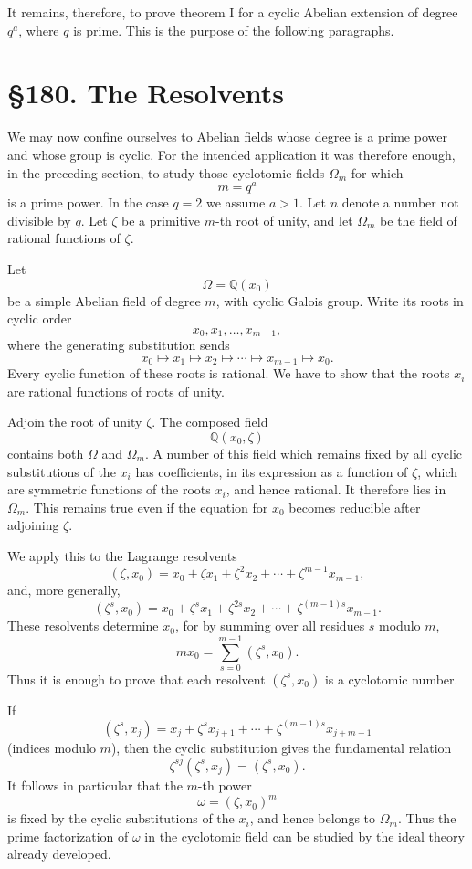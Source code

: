 \documentclass[12pt,a4paper]{article}
\newcommand{\webersection}[2]{\clearpage\section*{\S #1. #2}}
\newcommand{\Om}{\Omega_m}
\newcommand{\zetaS}{\zeta}
\begin{document}
It remains, therefore, to prove theorem I for a cyclic Abelian extension of degree \(q^a\), where \(q\) is prime.  This is the purpose of the following paragraphs.

\webersection{180}{The Resolvents}

We may now confine ourselves to Abelian fields whose degree is a prime power and whose group is cyclic.  For the intended application it was therefore enough, in the preceding section, to study those cyclotomic fields \(\Om\) for which
\[
  m=q^a
\tag{1}
\]
is a prime power.  In the case \(q=2\) we assume \(a>1\).  Let \(n\) denote a number not divisible by \(q\).  Let \(\zetaS\) be a primitive \(m\)-th root of unity, and let \(\Om\) be the field of rational functions of \(\zetaS\).

Let
\[
  \Omega=\mathbb Q(x_0)
\]
be a simple Abelian field of degree \(m\), with cyclic Galois group.  Write its roots in cyclic order
\[
  x_0,x_1,\ldots,x_{m-1},
\]
where the generating substitution sends
\[
  x_0\mapsto x_1\mapsto x_2\mapsto\cdots\mapsto x_{m-1}\mapsto x_0.
\tag{2}
\]
Every cyclic function of these roots is rational.  We have to show that the roots \(x_i\) are rational functions of roots of unity.

Adjoin the root of unity \(\zetaS\).  The composed field
\[
  \mathbb Q(x_0,\zetaS)
\]
contains both \(\Omega\) and \(\Om\).  A number of this field which remains fixed by all cyclic substitutions of the \(x_i\) has coefficients, in its expression as a function of \(\zetaS\), which are symmetric functions of the roots \(x_i\), and hence rational.  It therefore lies in \(\Om\).  This remains true even if the equation for \(x_0\) becomes reducible after adjoining \(\zetaS\).

We apply this to the Lagrange resolvents
\[
  (\zetaS,x_0)=x_0+\zetaS x_1+\zetaS^2x_2+\cdots+\zetaS^{m-1}x_{m-1},
\tag{3}
\]
and, more generally,
\[
  (\zetaS^s,x_0)=x_0+\zetaS^s x_1+\zetaS^{2s}x_2+\cdots+\zetaS^{(m-1)s}x_{m-1}.
\tag{4}
\]
These resolvents determine \(x_0\), for by summing over all residues \(s\) modulo \(m\),
\[
  m x_0=\sum_{s=0}^{m-1}(\zetaS^s,x_0).
\tag{5}
\]
Thus it is enough to prove that each resolvent \((\zetaS^s,x_0)\) is a cyclotomic number.

If
\[
  (\zetaS^s,x_j)=x_j+\zetaS^s x_{j+1}+\cdots+\zetaS^{(m-1)s}x_{j+m-1}
\]
(indices modulo \(m\)), then the cyclic substitution gives the fundamental relation
\[
  \zetaS^{sj}(\zetaS^s,x_j)=(\zetaS^s,x_0).
\tag{6}
\]
It follows in particular that the \(m\)-th power
\[
  \omega=(\zetaS,x_0)^m
\tag{7}
\]
is fixed by the cyclic substitutions of the \(x_i\), and hence belongs to \(\Om\).  Thus the prime factorization of \(\omega\) in the cyclotomic field can be studied by the ideal theory already developed.
\end{document}
